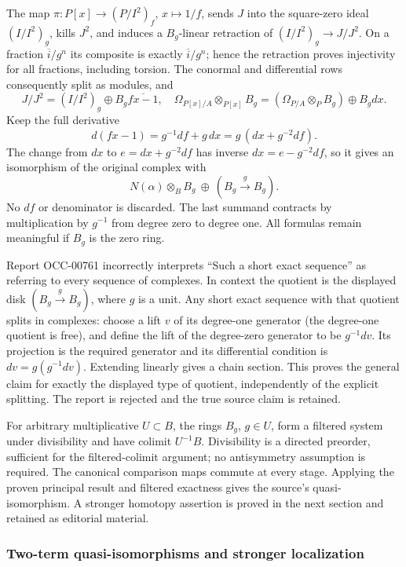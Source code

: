 The map \(\pi:P[x]\to(P/I^2)_f\), \(x\mapsto1/f\), sends \(J\) into the square-zero ideal \((I/I^2)_g\), kills \(J^2\), and induces a \(B_g\)-linear retraction of \((I/I^2)_g\to J/J^2\). On a fraction \(\overline i/g^n\) its composite is exactly \(\overline i/g^n\); hence the retraction proves injectivity for all fractions, including torsion. The conormal and differential rows consequently split as modules, and \[
J/J^2=(I/I^2)_g\oplus B_g\overline{fx-1},\quad
\Omega_{P[x]/A}\otimes_{P[x]}B_g
=(\Omega_{P/A}\otimes_P B_g)\oplus B_gdx.
\] Keep the full derivative \[
d(fx-1)=g^{-1}df+g\,dx=g\,(dx+g^{-2}df).
\] The change from \(dx\) to \(e=dx+g^{-2}df\) has inverse \(dx=e-g^{-2}df\), so it gives an isomorphism of the original complex with \[
N(\alpha)\otimes_B B_g\ \oplus\ (B_g\xrightarrow{g}B_g).
\] No \(df\) or denominator is discarded. The last summand contracts by multiplication by \(g^{-1}\) from degree zero to degree one. All formulas remain meaningful if \(B_g\) is the zero ring.

Report OCC-00761 incorrectly interprets ``Such a short exact sequence'' as referring to every sequence of complexes. In context the quotient is the displayed disk \((B_g\xrightarrow g B_g)\), where \(g\) is a unit. Any short exact sequence with that quotient splits in complexes: choose a lift \(v\) of its degree-one generator (the degree-one quotient is free), and define the lift of the degree-zero generator to be \(g^{-1}dv\). Its projection is the required generator and its differential condition is \(dv=g(g^{-1}dv)\). Extending linearly gives a chain section. This proves the general claim for exactly the displayed type of quotient, independently of the explicit splitting. The report is rejected and the true source claim is retained.

For arbitrary multiplicative \(U\subset B\), the rings \(B_g\), \(g\in U\), form a filtered system under divisibility and have colimit \(U^{-1}B\). Divisibility is a directed preorder, sufficient for the filtered-colimit argument; no antisymmetry assumption is required. The canonical comparison maps commute at every stage. Applying the proven principal result and filtered exactness gives the source's quasi-isomorphism. A stronger homotopy assertion is proved in the next section and retained as editorial material.

\subsubsection{Two-term quasi-isomorphisms and stronger localization}\label{two-term-quasi-isomorphisms-and-stronger-localization}

